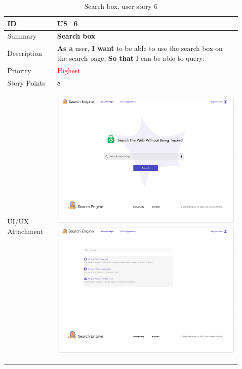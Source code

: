 \documentclass{scrartcl}
\begin{document}
\begin{table}[H]
  \caption{Search box, user story 6}
  \begin{tabular}{p{0.20\linewidth} | p{0.74\linewidth}}
    \toprule
    ID & US\_6
    \\\midrule
    Summary & \textbf{Search box}
    \\\hline
    Description & \textbf{As a} user, \textbf{I want} to be able to use the search box on the search page, \textbf{So that} I can be able to query.
    \\\hline
    Priority & \textcolor{red}{Highest}
    \\\hline
    Story Points & 8
    \\\hline
    UI/UX Attachment & {
                       \begin{center}
                         \includegraphics[scale=0.2]{search-box.pdf}
                         \includegraphics[scale=0.2]{search-result.pdf}

\end{center}}
\end{tabular}
\end{table}
\end{document}
